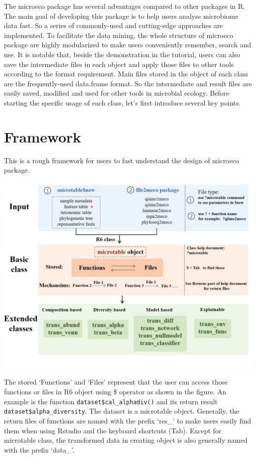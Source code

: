 \documentclass[
]{book}
\begin{document}
The microeco package has several advantages compared to other packages in R.
The main goal of developing this package is to help users analyse microbiome data fast.
So a series of commonly-used and cutting-edge approaches are implemented.
To facilitate the data mining, the whole structure of microeco package are highly modularized to
make users conveniently remember, search and use.
It is notable that, beside the demonstration in the tutorial, users can also save the intermediate files in each object and
apply those files to other tools according to the format requirement.
Main files stored in the object of each class are the frequently-used data.frame format.
So the intermediate and result files are easily saved, modified and used for other tools in microbial ecology.
Before starting the specific usage of each class, let's first introduce several key points.

\hypertarget{framework}{%
\section{Framework}\label{framework}}

This is a rough framework for users to fast understand the design of microeco package.

\begin{center}\includegraphics[width=8000px]{Images/microeco_framework} \end{center}

The stored `Functions' and `Files' represent that the user can access those functions or files in R6 object using \$ operator
as shown in the figure. An example is the function \texttt{dataset\$cal\_alphadiv()} and its return result \texttt{dataset\$alpha\_diversity}.
The dataset is a microtable object.
Generally, the return files of functions are named with the prefix `res\_' to make users easily find them when using Rstudio and the keyboard shortcuts (Tab).
Except for microtable class, the transformed data in creating object is also generally named with the prefix `data\_'.
\end{document}
